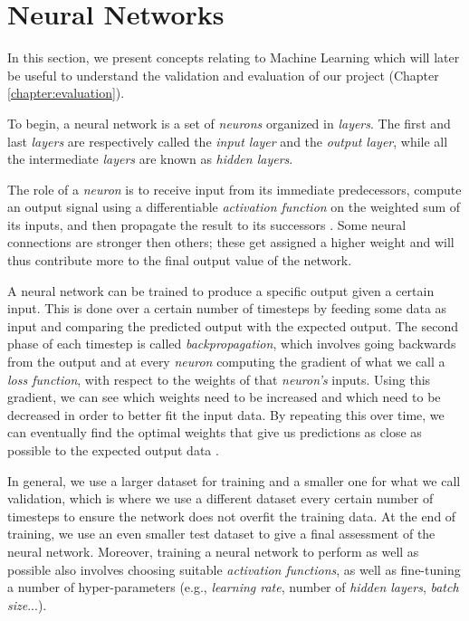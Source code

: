 \section{Neural Networks}
\label{sec:neural_networks}

In this section, we present concepts relating to Machine Learning which will later be useful to understand the validation and evaluation of our project (Chapter \ref{chapter:evaluation}).

To begin, a neural network is a set of \textit{neurons} organized in \textit{layers}. The first and last \textit{layers} are respectively called the \textit{input layer} and the \textit{output layer}, while all the intermediate \textit{layers} are known as \textit{hidden layers}.

The role of a \textit{neuron} is to receive input from its immediate predecessors, compute an output signal using a differentiable \textit{activation function} on the weighted sum of its inputs, and then propagate the result to its successors \cite{krose_introduction_1993}. Some neural connections are stronger then others; these get assigned a higher weight and will thus contribute more to the final output value of the network.

A neural network can be trained to produce a specific output given a certain input. This is done over a certain number of timesteps by feeding some data as input and comparing the predicted output with the expected output. The second phase of each timestep is called \textit{backpropagation}, which involves going backwards from the output and at every \textit{neuron} computing the gradient of what we call a \textit{loss function}, with respect to the weights of that \textit{neuron's} inputs. Using this gradient, we can see which weights need to be increased and which need to be decreased in order to better fit the input data. By repeating this over time, we can eventually find the optimal weights that give us predictions as close as possible to the expected output data \cite{krose_introduction_1993}.

In general, we use a larger dataset for training and a smaller one for what we call validation, which is where we use a different dataset every certain number of timesteps to ensure the network does not overfit the training data. At the end of training, we use an even smaller test dataset to give a final assessment of the neural network. Moreover, training a neural network to perform as well as possible also involves choosing suitable \textit{activation functions}, as well as fine-tuning a number of hyper-parameters (e.g., \textit{learning rate}, number of \textit{hidden layers}, \textit{batch size}...).

